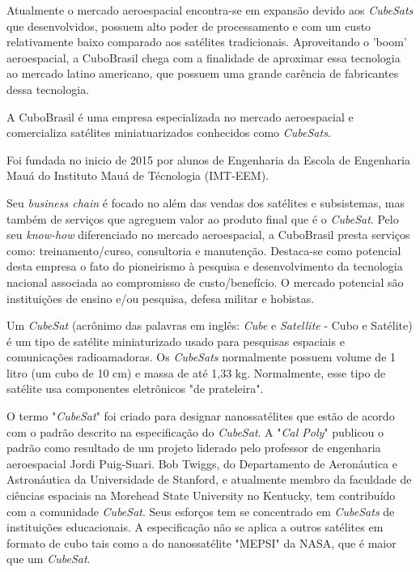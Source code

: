 \documentclass[
	12pt,				%
	openright,			%
	oneside,			%
	a4paper,			%
	english,			%
	french,				%
	spanish,			%
	brazil				%
	]{abntex2}
\begin{document}
	Atualmente o mercado aeroespacial encontra-se em expansão devido aos \textit{CubeSats} que desenvolvidos, possuem alto poder de processamento e com um custo relativamente baixo comparado aos satélites tradicionais. Aproveitando o 'boom' aeroespacial, a CuboBrasil chega com a finalidade de aproximar essa tecnologia ao mercado latino americano, que possuem uma grande carência de fabricantes dessa tecnologia.
	
	A CuboBrasil é uma empresa especializada no mercado aeroespacial e comercializa satélites miniatuarizados conhecidos como \textit{CubeSats}. 
	
	Foi fundada no inicio de 2015 por alunos de Engenharia da Escola de Engenharia Mauá do Instituto Mauá de Técnologia (IMT-EEM). 
	
	Seu \textit{business chain} é focado no além das vendas dos satélites e subsistemas, mas também de serviços que agreguem valor ao produto final que é o \textit{CubeSat}. Pelo seu \textit{know-how} diferenciado no mercado aeroespacial, a CuboBrasil presta serviços como: treinamento/curso, consultoria e manutenção. Destaca-se como potencial desta empresa o fato do pioneirismo à pesquisa e desenvolvimento da tecnologia nacional associada ao compromisso de custo/benefício. O mercado potencial são instituições de ensino e/ou pesquisa, defesa militar e hobistas.
	
	Um \textit{CubeSat} (acrônimo das palavras em inglês: \textit{Cube} e \textit{Satellite} - Cubo e Satélite) é um tipo de satélite miniaturizado usado para pesquisas espaciais e comunicações radioamadoras. Os \textit{CubeSats} normalmente possuem volume de 1 litro (um cubo de 10 cm) e massa de até 1,33 kg. Normalmente, esse tipo de satélite usa componentes eletrônicos "de prateleira".
	
	O termo "\textit{CubeSat}" foi criado para designar nanossatélites que estão de acordo com o padrão descrito na especificação do \textit{CubeSat}. A "\textit{Cal Poly}" publicou o padrão como resultado de um projeto liderado pelo professor de engenharia aeroespacial Jordi Puig-Suari. Bob Twiggs, do Departamento de Aeronáutica e Astronáutica da Universidade de Stanford, e atualmente membro da faculdade de ciências espaciais na Morehead State University no Kentucky, tem contribuído com a comunidade \textit{CubeSat}. Seus esforços tem se concentrado em \textit{CubeSats} de instituições educacionais. A especificação não se aplica a outros satélites em formato de cubo tais como a do nanossatélite "MEPSI" da NASA, que é maior que um \textit{CubeSat}.
\end{document}
